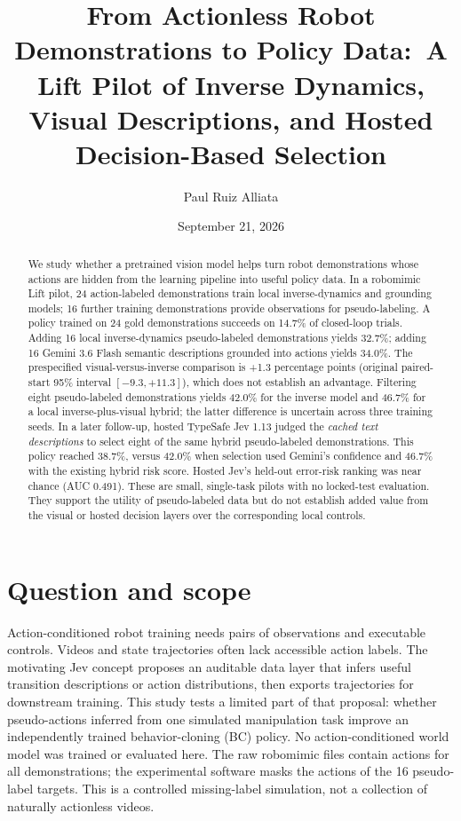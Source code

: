 \documentclass[11pt]{article}
\title{From Actionless Robot Demonstrations to Policy Data:\ A Lift Pilot of Inverse Dynamics, Visual Descriptions, and Hosted Decision-Based Selection}
\author{Paul Ruiz Alliata}
\date{September 21, 2026}
\begin{document}
\maketitle

\begin{abstract}
We study whether a pretrained vision model helps turn robot demonstrations
whose actions are hidden from the learning pipeline into useful policy data.
In a robomimic Lift pilot, 24 action-labeled demonstrations train local
inverse-dynamics and grounding models; 16 further training demonstrations
provide observations for pseudo-labeling. A policy trained on 24 gold
demonstrations succeeds on 14.7\% of closed-loop trials. Adding 16 local
inverse-dynamics pseudo-labeled demonstrations yields 32.7\%; adding 16
Gemini 3.6 Flash semantic descriptions grounded into actions yields 34.0\%.
The prespecified visual-versus-inverse comparison is +1.3 percentage points
(original paired-start 95\% interval $[-9.3,+11.3]$), which does not establish
an advantage. Filtering eight pseudo-labeled demonstrations yields 42.0\%
for the inverse model and 46.7\% for a local inverse-plus-visual hybrid;
the latter difference is uncertain across three training seeds. In a later
follow-up, hosted TypeSafe Jev 1.13 judged the \emph{cached text descriptions}
to select eight of the same hybrid pseudo-labeled demonstrations. This policy
reached 38.7\%, versus 42.0\% when selection used Gemini's confidence and
46.7\% with the existing hybrid risk score. Hosted Jev's held-out error-risk
ranking was near chance (AUC 0.491). These are small, single-task pilots with
no locked-test evaluation. They support the utility of pseudo-labeled data
but do not establish added value from the visual or hosted decision layers
over the corresponding local controls.
\end{abstract}

\section{Question and scope}
Action-conditioned robot training needs pairs of observations and executable
controls. Videos and state trajectories often lack accessible action labels.
The motivating Jev concept proposes an auditable data layer that infers useful
transition descriptions or action distributions, then exports trajectories
for downstream training. This study tests a limited part of that proposal:
whether pseudo-actions inferred from one simulated manipulation task improve
an independently trained behavior-cloning (BC) policy. No action-conditioned
world model was trained or evaluated here. The raw robomimic files contain
actions for all demonstrations; the experimental software masks the actions
of the 16 pseudo-label targets. This is a controlled missing-label simulation,
not a collection of naturally actionless videos.
\end{document}
